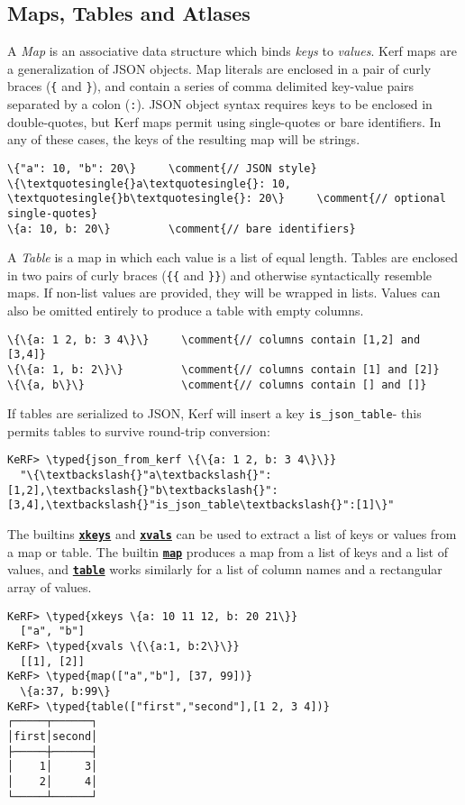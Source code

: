 \documentclass{article}
\newcommand{\typed}[1]{\textcolor{TealBlue}{#1}}
\newcommand{\comment}[1]{\textcolor{Orange}{#1}}
\newcommand{\primu}[2]{\hyperref[prim:#2]{\textbf{\texttt{#1}}}}
\newcommand{\prim}[1]{\primu{#1}{#1}}
\begin{document}
\pagebreak
\subsection{Maps, Tables and Atlases}
A \emph{Map} is an associative data structure which binds \emph{keys} to \emph{values}. Kerf maps are a generalization of JSON objects. Map literals are enclosed in a pair of curly braces (\texttt{\{} and \texttt{\}}), and contain a series of comma delimited key-value pairs separated by a colon (\texttt{:}). JSON object syntax requires keys to be enclosed in double-quotes, but Kerf maps permit using single-quotes or bare identifiers. In any of these cases, the keys of the resulting map will be strings.
\begin{Verbatim}
\{"a": 10, "b": 20\}     \comment{// JSON style}
\{\textquotesingle{}a\textquotesingle{}: 10, \textquotesingle{}b\textquotesingle{}: 20\}     \comment{// optional single-quotes}
\{a: 10, b: 20\}         \comment{// bare identifiers}
\end{Verbatim}

\vspace{0.5cm}

A \emph{Table} is a map in which each value is a list of equal length. Tables are enclosed in two pairs of curly braces (\texttt{\{\{} and \texttt{\}\}}) and otherwise syntactically resemble maps. If non-list values are provided, they will be wrapped in lists. Values can also be omitted entirely to produce a table with empty columns.
\begin{Verbatim}
\{\{a: 1 2, b: 3 4\}\}     \comment{// columns contain [1,2] and [3,4]}
\{\{a: 1, b: 2\}\}         \comment{// columns contain [1] and [2]}
\{\{a, b\}\}               \comment{// columns contain [] and []}
\end{Verbatim}

If tables are serialized to JSON, Kerf will insert a key \texttt{is\_json\_table}- this permits tables to survive round-trip conversion:
\begin{Verbatim}
KeRF> \typed{json_from_kerf \{\{a: 1 2, b: 3 4\}\}}
  "\{\textbackslash{}"a\textbackslash{}":[1,2],\textbackslash{}"b\textbackslash{}":[3,4],\textbackslash{}"is_json_table\textbackslash{}":[1]\}"
\end{Verbatim}

The builtins \prim{xkeys} and \prim{xvals} can be used to extract a list of keys or values from a map or table. The builtin \prim{map} produces a map from a list of keys and a list of values, and \prim{table} works similarly for a list of column names and a rectangular array of values.
\begin{Verbatim}
KeRF> \typed{xkeys \{a: 10 11 12, b: 20 21\}}
  ["a", "b"]
KeRF> \typed{xvals \{\{a:1, b:2\}\}}
  [[1], [2]]
KeRF> \typed{map(["a","b"], [37, 99])}
  \{a:37, b:99\}
KeRF> \typed{table(["first","second"],[1 2, 3 4])}
┌─────┬──────┐
│first│second│
├─────┼──────┤
│    1│     3│
│    2│     4│
└─────┴──────┘
\end{Verbatim}
\end{document}

